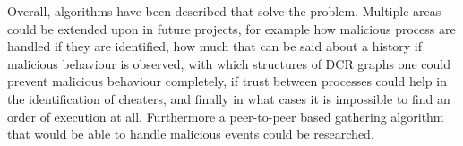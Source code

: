 \newpar Overall, algorithms have been described that solve the problem. Multiple areas could be extended upon in future projects, for example how malicious process are handled if they are identified, how much that can be said about a history if malicious behaviour is observed, with which structures of DCR graphs one could prevent malicious behaviour completely, if trust between processes could help in the identification of cheaters, and finally in what cases it is impossible to find an order of execution at all. Furthermore a peer-to-peer based gathering algorithm that would be able to handle malicious events could be researched.